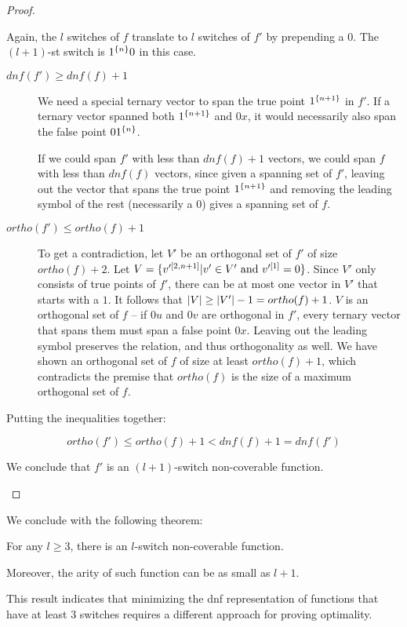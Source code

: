 \begin{proof}
\begin{enumerate}
Again,
the $l$ switches of $f$ translate to $l$ switches of $f'$
by prepending a $0$.
The $(l+1)$-st switch is $1^{\{n\}} 0$ in this case.

\begin{description}
\item[$dnf(f') \geq dnf(f) + 1$]
We need a special ternary vector to span the true point
$1^{\{n+1\}}$ in $f'$.
If a ternary vector spanned both $1^{\{n+1\}}$
and $0 x$,
it would necessarily also span the false point
$0 1^{\{n\}}$.

If we could span $f'$ with less than $dnf(f) + 1$ vectors,
we could span $f$ with less than $dnf(f)$ vectors,
since given a spanning set of $f'$,
leaving out the vector
that spans the true point $1^{\{n+1\}}$
and removing the leading symbol of the rest
(necessarily a $0$)
gives a spanning set of $f$.

\item[$ortho(f') \leq ortho(f) + 1$]
To get a contradiction,
let $V'$ be an orthogonal set of $f'$
of size $ortho(f) + 2$.
Let $V = \{v'^{[2, n+1]} | v' \in V'
\text{ and } v'^{[1]} = 0\}$.
Since $V'$ only consists of true points of $f'$,
there can be at most one vector in $V'$
that starts with a $1$.
It follows that
$\lvert V\rvert \geq \lvert V'\rvert - 1 = ortho(f) + 1$.
$V$ is an orthogonal set of $f$ --
if $0 u$ and $0 v$ are orthogonal in $f'$,
every ternary vector that spans them must span
a false point $0 x$.
Leaving out the leading symbol preserves the relation,
and thus orthogonality as well.
We have shown an orthogonal set of $f$ of size at least
$ortho(f) + 1$,
which contradicts the premise that $ortho(f)$ is the size
of a maximum orthogonal set of $f$.
\end{description}

Putting the inequalities together:

\[
ortho(f') \leq ortho(f) + 1 < dnf(f) + 1 = dnf(f')
\]

We conclude that $f'$ is an $(l+1)$-switch non-coverable
function.
\end{enumerate}
\end{proof}

We conclude with the following theorem:

\begin{theorem}
For any $l \geq 3$,
there is an $l$-switch non-coverable function.

Moreover, the arity of such function can be as small as
$l+1$.
\end{theorem}

This result indicates that minimizing the \acrshort{dnf}
representation of functions that have at least $3$ switches
requires a different approach for proving optimality.

